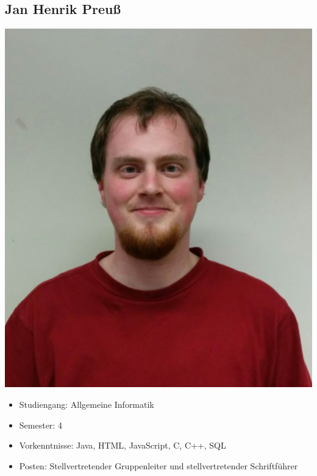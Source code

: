 \subsection{Jan Henrik Preuß}
\begin{minipage}{0.28\textwidth} 
\includegraphics[width=\textwidth]{content/pictures/Gruppenbilder/Jan.png}
\end{minipage}%
\begin{minipage}{0.7\textwidth}
\begin{itemize}
   \item Studiengang: Allgemeine Informatik
  \item Semester: 4
  \item Vorkenntnisse: Java, HTML, JavaScript, C, C++, SQL
  \item Posten: Stellvertretender Gruppenleiter und stellvertretender Schriftführer
\end{itemize}
\end{minipage}

